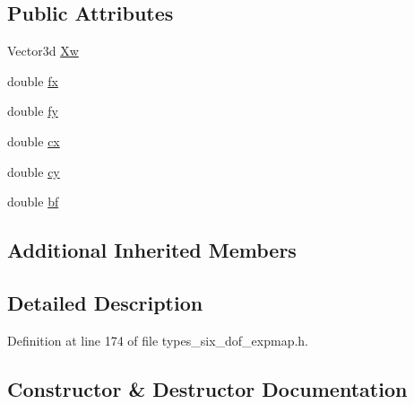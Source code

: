 \subsection*{Public Attributes}
\begin{DoxyCompactItemize}
\item 
Vector3d \hyperlink{classg2o_1_1EdgeStereoSE3ProjectXYZOnlyPose_aa7c861f93edd02d3ef763c0e706cf496}{Xw}
\item 
double \hyperlink{classg2o_1_1EdgeStereoSE3ProjectXYZOnlyPose_aebf839be304521edf2f3cb445b3bf618}{fx}
\item 
double \hyperlink{classg2o_1_1EdgeStereoSE3ProjectXYZOnlyPose_a7f779153148f1eb403ab6f2984b47eec}{fy}
\item 
double \hyperlink{classg2o_1_1EdgeStereoSE3ProjectXYZOnlyPose_a7b0f52c3f2931706838373ca7d4513a7}{cx}
\item 
double \hyperlink{classg2o_1_1EdgeStereoSE3ProjectXYZOnlyPose_a95e79aa1ef43455cd6de7ccced2fc1e8}{cy}
\item 
double \hyperlink{classg2o_1_1EdgeStereoSE3ProjectXYZOnlyPose_a831d3e73bf61102622a7ac6af0475e7b}{bf}
\end{DoxyCompactItemize}
\subsection*{Additional Inherited Members}


\subsection{Detailed Description}


Definition at line 174 of file types\+\_\+six\+\_\+dof\+\_\+expmap.\+h.



\subsection{Constructor \& Destructor Documentation}
